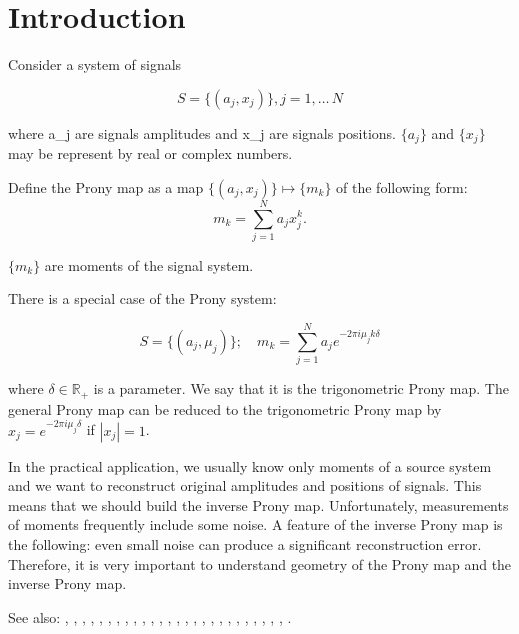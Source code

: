 \section{Introduction}

Consider a system of signals

$$
S = \{ (a_j, x_j) \}, j = 1, \ldots\, N
$$

where a_j are signals amplitudes and x_j are signals positions. $\{a_j\}$ and $\{x_j\}$ may be represent by real or complex numbers. \par

Define the Prony map as a map $\{ (a_j, x_j) \} \mapsto \{m_k\}$ of the following form:
$$
m_k = \sum_{j=1}^N a_j x_j^k.
$$
  
$\{m_k\}$ are moments of the signal system.

There is a special case of the Prony system:

$$
S = \{ (a_j, \mu_j) \}; \quad m_k = \sum_{j=1}^N a_j e^{-2\pi i \mu_j k \delta}
$$

where $\delta \in \mathbb{R}_+$ is a parameter. We say that it is the trigonometric Prony map. The general Prony map can be reduced to the trigonometric Prony map by $x_j = e^{-2\pi i \mu_j \delta}$ if $|x_j| = 1$.

In the practical application, we usually know only moments of a source system and we want to reconstruct original amplitudes and positions of signals. This means that we should build the inverse Prony map. Unfortunately, measurements of moments frequently include some noise. A feature of the inverse Prony map is the following: even small noise can produce a significant reconstruction error. Therefore, it is very important to understand geometry of the Prony map and the inverse Prony map.

See also: \cite{2015arXiv150206932A}, \cite{azais_spike}, \cite{batenkov_numerical_2014}, \cite{batenkov_accurate_2014}, \cite{Bat.Sar.Yom}, \cite{Bat.Yom2}, \cite{Bat.Yom.Sampta13}, \cite{Bat.Yom1}, \cite{candes_towards_2014}, \cite{candes_super-resolution_2013}, \cite{demanet_super-resolution_2013}, \cite{donoho_superresolution_1992}, \cite{Don1}, \cite{duval_exact_2013}, \cite{fernandez-granda_support_2013}, \cite{heckel_super-resolution_2014}, \cite{Lev.Ful}, \cite{liao_music_2014}, \cite{McC}, \cite{Min.Kaw.Min}, \cite{moitra_threshold_2014}, \cite{Ode.Bar.Pis}, \cite{Sle}, \cite{Yom2}, \cite{Yom1}, \cite{Dem.Ngu}, \cite{Mor.Can}.
  
  
  
  
  
  
  
  
  
  
  